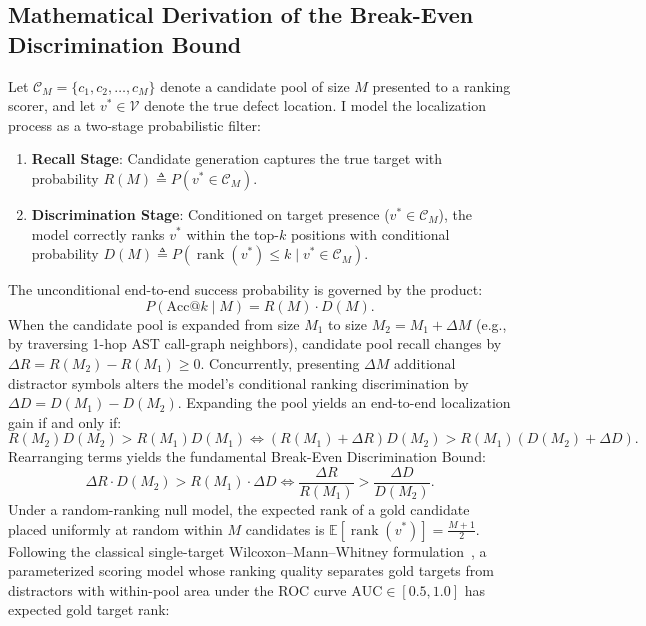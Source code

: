 \documentclass[10pt]{article}
\begin{document}
\subsection{Mathematical Derivation of the Break-Even Discrimination Bound}
\label{app:breakeven_derivation}
Let $\mathcal{C}_M = \{c_1, c_2, \dots, c_M\}$ denote a candidate pool of size $M$ presented to a ranking scorer, and let $v^* \in \mathcal{V}$ denote the true defect location. I model the localization process as a two-stage probabilistic filter:
\begin{enumerate}[noitemsep,topsep=2pt,parsep=0pt,partopsep=0pt]
    \item \textbf{Recall Stage}: Candidate generation captures the true target with probability $R(M) \triangleq P(v^* \in \mathcal{C}_M)$.
    \item \textbf{Discrimination Stage}: Conditioned on target presence ($v^* \in \mathcal{C}_M$), the model correctly ranks $v^*$ within the top-$k$ positions with conditional probability $D(M) \triangleq P(\operatorname{rank}(v^*) \le k \mid v^* \in \mathcal{C}_M)$.
\end{enumerate}
The unconditional end-to-end success probability is governed by the product:
\begin{equation}
P(\text{Acc@}k \mid M) = R(M) \cdot D(M).
\end{equation}
When the candidate pool is expanded from size $M_1$ to size $M_2 = M_1 + \Delta M$ (e.g., by traversing 1-hop AST call-graph neighbors), candidate pool recall changes by $\Delta R = R(M_2) - R(M_1) \ge 0$. Concurrently, presenting $\Delta M$ additional distractor symbols alters the model's conditional ranking discrimination by $\Delta D = D(M_1) - D(M_2)$. Expanding the pool yields an end-to-end localization gain if and only if:
\begin{equation}
R(M_2) D(M_2) > R(M_1) D(M_1) \iff (R(M_1) + \Delta R) D(M_2) > R(M_1) (D(M_2) + \Delta D).
\end{equation}
Rearranging terms yields the fundamental Break-Even Discrimination Bound:
\begin{equation}
\Delta R \cdot D(M_2) > R(M_1) \cdot \Delta D \iff \frac{\Delta R}{R(M_1)} > \frac{\Delta D}{D(M_2)}.
\label{eq:breakeven_formal}
\end{equation}
Under a random-ranking null model, the expected rank of a gold candidate placed uniformly at random within $M$ candidates is $\mathbb{E}[\operatorname{rank}(v^*)] = \frac{M+1}{2}$. Following the classical single-target Wilcoxon--Mann--Whitney formulation~\cite{bamber1975area}, a parameterized scoring model whose ranking quality separates gold targets from distractors with within-pool area under the ROC curve $\text{AUC} \in [0.5, 1.0]$ has expected gold target rank:
\end{document}

